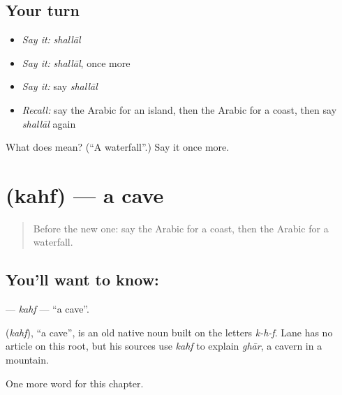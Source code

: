 \subsection*{Your turn}
\begin{itemize}
\raggedright
  \item \emph{Say it:} \emph{shallāl}
  \item \emph{Say it:} \emph{shallāl}, once more
  \item \emph{Say it:} say \emph{shallāl}
  \item \emph{Recall:} say the Arabic for an island, then the Arabic for a coast, then say \emph{shallāl} again
\end{itemize}

\begin{tcolorbox}[breakable,colback=teal!4,colframe=teal!35!black,title={Before you move on}]
What does  mean? (\textquotedblleft{}A waterfall\textquotedblright{}.) Say it once more.
\end{tcolorbox}
\section[\texorpdfstring{\ar{كهف} (kahf)}{كهف (kahf)}]{ (kahf) — a cave}

\label{lesson:AR-C132-kahf}



\begin{quote}
Before the new one: say the Arabic for a coast, then the Arabic for a waterfall.
\end{quote}

\subsection*{You'll want to know: }
\textbf{} — \emph{kahf} — \textquotedblleft{}a cave\textquotedblright{}.

\begin{cousinweb}
\textbf{} (\emph{kahf}), \textquotedblleft{}a cave\textquotedblright{}, is an old native noun built on the letters \emph{k-h-f}. Lane has no article on this root, but his sources use \emph{kahf} to explain \emph{ghār}, a cavern in a mountain.
\end{cousinweb}

\begin{grammarlens}[title={What you've built}]
One more word for this chapter.
\end{grammarlens}

